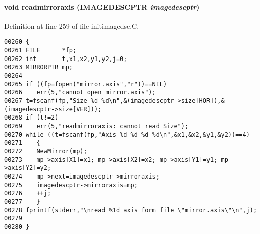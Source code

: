 \paragraph{\setlength{\rightskip}{0pt plus 5cm}void readmirroraxis ({\bf IMAGEDESCPTR} {\em imagedescptr})}\hfill



Definition at line 259 of file initimagedsc.C.\small\begin{verbatim}00260 {
00261 FILE      *fp;
00262 int       t,x1,x2,y1,y2,j=0;
00263 MIRRORPTR mp;
00264 
00265 if ((fp=fopen("mirror.axis","r"))==NIL)
00266    err(5,"cannot open mirror.axis");
00267 t=fscanf(fp,"Size %d %d\n",&(imagedescptr->size[HOR]),&(imagedescptr->size[VER]));
00268 if (t!=2)
00269    err(5,"readmirroraxis: cannot read Size");
00270 while ((t=fscanf(fp,"Axis %d %d %d %d\n",&x1,&x2,&y1,&y2))==4)
00271    {
00272    NewMirror(mp);
00273    mp->axis[X1]=x1; mp->axis[X2]=x2; mp->axis[Y1]=y1; mp->axis[Y2]=y2;
00274    mp->next=imagedescptr->mirroraxis;
00275    imagedescptr->mirroraxis=mp;
00276    ++j;
00277    }
00278 fprintf(stderr,"\nread %1d axis form file \"mirror.axis\"\n",j);
00279 
00280 }
\end{verbatim}\normalsize 
